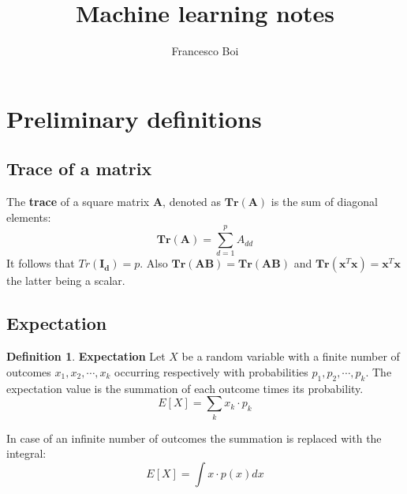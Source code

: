 \documentclass[12pt, letterpaper]{article}
\theoremstyle{definition}
\newtheorem{definition}{Definition}[section]
\newcommand{\Tr}{\mathbf{Tr}}
\newcommand{\x}{\mathbf{x}}
\begin{document}
\title{Machine learning notes}
\author{Francesco Boi}
\date{\vspace{-5ex}}
\maketitle
\section{Preliminary definitions}
\subsection{Trace of a matrix}
\label{trace}
The \textbf{trace} of a square matrix $\mathbf{A}$, denoted as $\Tr(\mathbf{A})$ is the sum of diagonal elements:
\begin{equation}
\Tr(\mathbf{A}) = \sum_{d=1}^p A_{dd}
\end{equation}
It follows that $Tr(\mathbf{I_d}) = p$.
Also $\Tr(\mathbf{AB}) = \Tr(\mathbf{AB})$ and $\Tr(\x^T\x) = \x^T\x$ the latter being a scalar.

\subsection{Expectation}
\begin{definition}{\textbf{Expectation}}
Let $X$ be a random variable with a finite number of outcomes $x_1, x_2, \cdots, x_k$ occurring respectively with probabilities $p_1, p_2, \cdots, p_k$. The expectation value is the summation of each outcome times its probability.
\begin{equation}
E\left[ X\right]= \sum_k x_k \cdot p_k
\end{equation}

In case of an infinite number of outcomes the summation is replaced with the integral:
\begin{equation}
E\left[ X\right]= \int x \cdot p\left(x \right) dx
\end{equation}

\end{definition}
\end{document}
